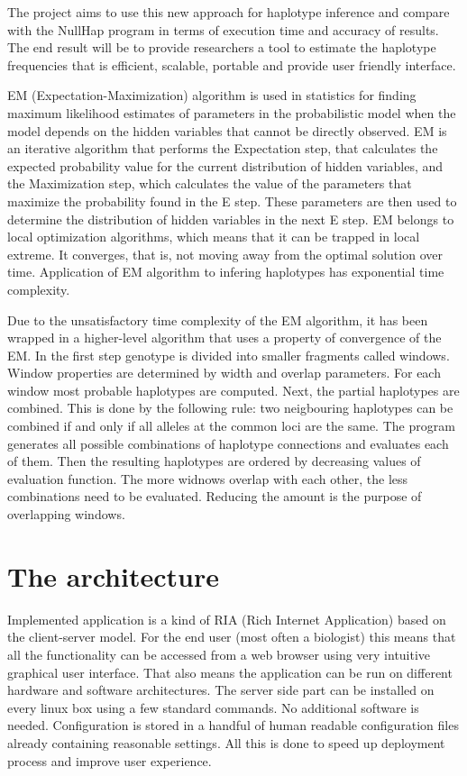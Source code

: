 \documentclass{llncs}
\begin{document}
The project aims to use this new approach for haplotype inference and compare with the NullHap program in terms of execution time and accuracy of results.
The end result will be to provide researchers a tool to estimate the haplotype frequencies that is efficient, scalable, portable and provide user friendly interface.

EM (Expectation-Maximization) algorithm  is used in statistics for finding maximum likelihood estimates of parameters in the probabilistic model when the model depends on the hidden variables that cannot be directly observed.
EM is an iterative algorithm that performs the Expectation step, that calculates the expected probability value for the current distribution of hidden variables, and the Maximization step, which calculates the value of the parameters that maximize the probability found in the E step.
These parameters are then used to determine the distribution of hidden variables in the next E step.
EM belongs to local optimization algorithms, which means that it can be trapped in local extreme.
It converges, that is, not moving away from the optimal solution over time.
Application of EM algorithm to infering haplotypes has exponential time complexity.

Due to the unsatisfactory time complexity of the EM algorithm, it has been wrapped in a higher-level algorithm that uses a property of convergence of the EM.
In the first step genotype is divided into smaller fragments called windows.
Window properties are determined by width and overlap parameters.
For each window most probable haplotypes are computed.
Next, the partial haplotypes are combined.
This is done by the following rule: two neigbouring haplotypes can be combined if and only if all alleles at the common loci are the same.
The program generates all possible combinations of haplotype connections and evaluates each of them.
Then the resulting haplotypes are ordered by decreasing values ​​of evaluation function.
The more widnows overlap with each other, the less combinations need to be evaluated.
Reducing the amount is the purpose of overlapping windows.

\section{The architecture}

Implemented application is a kind of RIA (Rich Internet Application) based on the client-server model. 
For the end user (most often a biologist) this means that all the functionality can be accessed from a web browser using very intuitive graphical user interface. 
That also means the application can be run on different hardware and software architectures. 
The server side part can be installed on every linux box using a few standard commands. 
No additional software is needed. 
Configuration is stored in a handful of human readable configuration files already containing reasonable settings. 
All this is done to speed up deployment process and improve user experience.
\end{document}
